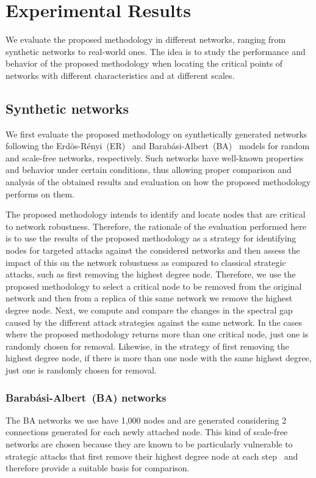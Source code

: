\documentclass[conference,fleqn]{IEEEtran}
\begin{document}
\section{Experimental Results}
\label{sec:Res}

We evaluate the proposed methodology in different networks, ranging from synthetic networks to real-world ones. The idea is to study
the performance and behavior of the proposed methodology when locating the critical points of networks with different characteristics
and at different scales.

\subsection{Synthetic networks}
\label{subsec:synt-nets}

We first evaluate the proposed methodology on synthetically generated networks following the
Erd\"{o}s-R\'{e}nyi~(ER)~\cite{Erdos1959} and Barab\'{a}si-Albert~(BA)~\cite{Barabasi1999} models
for random and scale-free networks, respectively. Such networks have well-known
properties and behavior under certain conditions, thus allowing proper comparison and
analysis of the obtained results and evaluation on how the proposed methodology performs on them.

The proposed methodology intends to identify and locate nodes that are critical to network robustness.
Therefore, the rationale of the evaluation performed here is to use the
results of the proposed methodology as a strategy for identifying nodes for targeted attacks against
the considered networks and then assess the impact of this on the network robustness as compared
to classical strategic attacks, such as first removing the highest degree node. Therefore,
we use the proposed methodology to select a critical node to be removed from the original network
and then from a replica of this same network we remove the highest degree node. Next, we 
compute and compare the changes in the spectral gap  caused by the different attack strategies against the same network. In the cases where the
proposed methodology returns more than one critical node, just one is randomly chosen for removal.
Likewise, in the strategy of first removing the highest degree node, if there is more than one
node with the same highest degree, just one is randomly chosen for removal.

\subsubsection{Barab\'{a}si-Albert~(BA) networks}
The BA networks we use have 1,000 nodes and are generated considering 2 connections generated for each newly attached node.
This kind of scale-free networks are chosen because they are known to be particularly vulnerable to strategic attacks that
first remove their highest degree node at each step~\cite{Albert2000a} and therefore provide a suitable basis for comparison.
\end{document}
